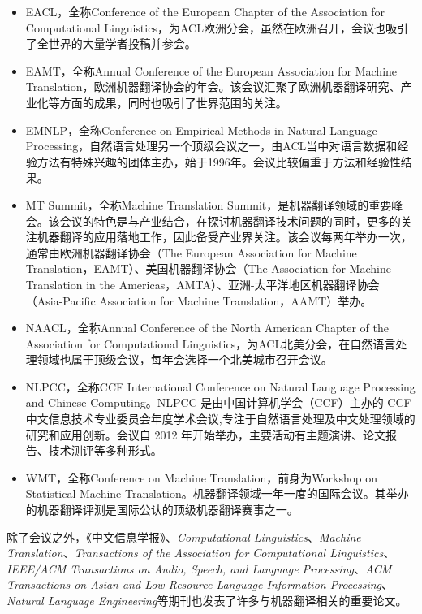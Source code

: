 \begin{itemize}
\vspace{0.5em}
\item EACL，全称Conference of the European Chapter of the Association for Computational Linguistics，为ACL欧洲分会，虽然在欧洲召开，会议也吸引了全世界的大量学者投稿并参会。
\vspace{0.5em}
\item EAMT，全称Annual Conference of the European Association for Machine Translation，欧洲机器翻译协会的年会。该会议汇聚了欧洲机器翻译研究、产业化等方面的成果，同时也吸引了世界范围的关注。
\vspace{0.5em}
\item EMNLP，全称Conference on Empirical Methods in Natural Language Processing，自然语言处理另一个顶级会议之一，由ACL当中对语言数据和经验方法有特殊兴趣的团体主办，始于1996年。会议比较偏重于方法和经验性结果。
\vspace{0.5em}
\item MT Summit，全称Machine Translation Summit，是机器翻译领域的重要峰会。该会议的特色是与产业结合，在探讨机器翻译技术问题的同时，更多的关注机器翻译的应用落地工作，因此备受产业界关注。该会议每两年举办一次，通常由欧洲机器翻译协会（The European Association for Machine Translation，EAMT）、美国机器翻译协会（The Association for Machine Translation in the Americas，AMTA）、亚洲-太平洋地区机器翻译协会（Asia-Pacific Association for Machine Translation，AAMT）举办。
\vspace{0.5em}
\item NAACL，全称Annual Conference of the North American Chapter of the Association for Computational Linguistics，为ACL北美分会，在自然语言处理领域也属于顶级会议，每年会选择一个北美城市召开会议。
\vspace{0.5em}
\item NLPCC，全称CCF International Conference on Natural Language Processing and Chinese Computing。NLPCC 是由中国计算机学会（CCF）主办的 CCF 中文信息技术专业委员会年度学术会议,专注于自然语言处理及中文处理领域的研究和应用创新。会议自 2012 年开始举办，主要活动有主题演讲、论文报告、技术测评等多种形式。
\vspace{0.5em}
\item WMT，全称Conference on Machine Translation，前身为Workshop on Statistical Machine Translation。机器翻译领域一年一度的国际会议。其举办的机器翻译评测是国际公认的顶级机器翻译赛事之一。
\vspace{0.5em}
\end{itemize}

除了会议之外，《中文信息学报》、\emph{Computational Linguistics}、\emph{Machine Translation}、\emph{Transactions of the Association for Computational Linguistics}、\emph{IEEE/ACM Transactions on Audio, Speech, and Language Processing}、\emph{ACM Transactions on Asian and Low Resource Language Information Processing}、\emph{Natural Language Engineering}等期刊也发表了许多与机器翻译相关的重要论文。










